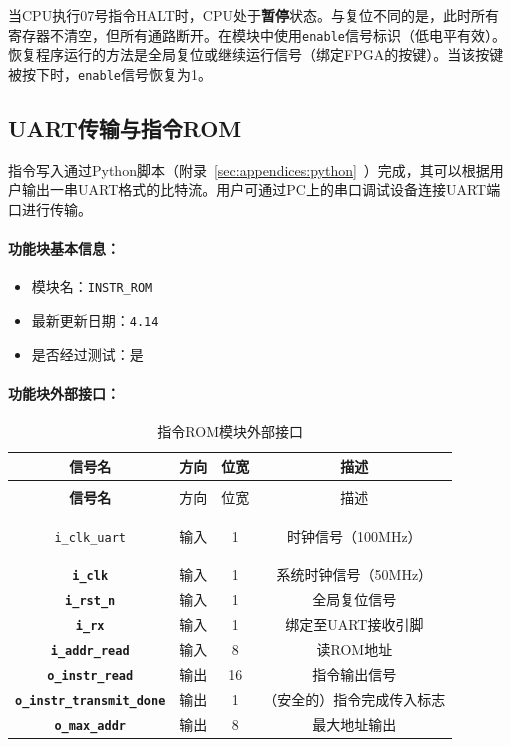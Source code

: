 \documentclass[lang=cn,a4paper,newtx]{elegantpaper}
\begin{document}
当CPU执行07号指令HALT时，CPU处于\textbf{暂停}状态。与复位不同的是，此时所有寄存器不清空，但所有通路断开。在模块中使用\texttt{enable}信号标识（低电平有效）。恢复程序运行的方法是全局复位或继续运行信号（绑定FPGA的按键）。当该按键被按下时，\texttt{enable}信号恢复为1。

\subsection{UART传输与指令ROM}
指令写入通过Python脚本（附录~\ref{sec:appendices:python}~）完成，其可以根据用户输出一串UART格式的比特流。用户可通过PC上的串口调试设备连接UART端口进行传输。

\paragraph{功能块基本信息：}
\begin{itemize}
  \item 模块名：\texttt{INSTR\_ROM}
  \item 最新更新日期：\texttt{4.14}
  \item 是否经过测试：是
\end{itemize}

\paragraph{功能块外部接口：}
\begin{longtable}{>{\bfseries}c c c c}
  \caption{指令ROM模块外部接口} \\ 
  \toprule
  信号名 & 方向 & 位宽 & 描述 \\
  \midrule
  \endfirsthead

  \multicolumn{4}{l}{\textbf{（续表）指令ROM模块外部接口}} \\
  \toprule
  信号名 & 方向 & 位宽 & 描述 \\
  \midrule
  \endhead
  
  \texttt{i\_clk\_uart} & 输入 & 1 & 时钟信号（100MHz） \\
  \texttt{i\_clk} & 输入 & 1 & 系统时钟信号（50MHz） \\
  \texttt{i\_rst\_n} & 输入 & 1 & 全局复位信号 \\
  \texttt{i\_rx} & 输入 & 1 & 绑定至UART接收引脚 \\
  \texttt{i\_addr\_read} & 输入 & 8 & 读ROM地址 \\
  \texttt{o\_instr\_read} & 输出 & 16 & 指令输出信号 \\
  \texttt{o\_instr\_transmit\_done} & 输出 & 1 & （安全的）指令完成传入标志 \\
  \texttt{o\_max\_addr} & 输出 & 8 & 最大地址输出 \\
  \bottomrule
\end{longtable}
\end{document}
